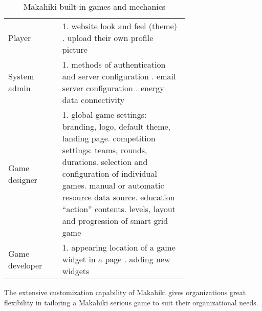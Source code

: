 \begin{table}[ht!]
  \centering
  \begin{tabular} {|l|P{0.7\linewidth}|}
    \hline
     &
      \\
    \hline
    Player & 1. website look and feel (theme) . upload their own profile picture\\
    \hline 
    System admin 
    & 1. methods of authentication and server configuration . email server configuration . energy data connectivity \\
    \hline 
    Game designer 
    & 1. global game settings: branding, logo, default theme, landing page. competition settings: teams, rounds, durations. selection and configuration of individual games. manual or automatic resource data source. education ``action'' contents. levels, layout and progression of smart grid game\\
    \hline 
     Game developer
    & 1. appearing location of a game widget in a page . adding new widgets\\
    \hline
  \end{tabular}
  \caption{Makahiki built-in games and mechanics}
  \label{table:makahiki-games}
\end{table}

The extensive customization capability of Makahiki gives organizations great flexibility in tailoring a Makahiki serious game to suit their organizational needs. 